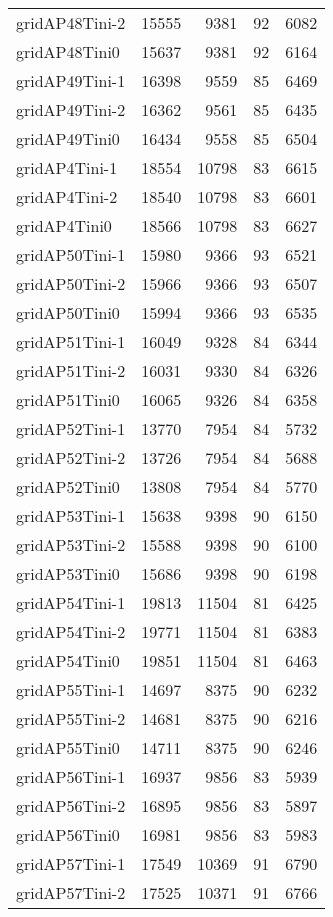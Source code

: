 \begin{longtable}{lrrrr}
gridAP48Tini-2 & 15555 & 9381 & 92 & 6082 \\
gridAP48Tini0 & 15637 & 9381 & 92 & 6164 \\
gridAP49Tini-1 & 16398 & 9559 & 85 & 6469 \\
gridAP49Tini-2 & 16362 & 9561 & 85 & 6435 \\
gridAP49Tini0 & 16434 & 9558 & 85 & 6504 \\
gridAP4Tini-1 & 18554 & 10798 & 83 & 6615 \\
gridAP4Tini-2 & 18540 & 10798 & 83 & 6601 \\
gridAP4Tini0 & 18566 & 10798 & 83 & 6627 \\
gridAP50Tini-1 & 15980 & 9366 & 93 & 6521 \\
gridAP50Tini-2 & 15966 & 9366 & 93 & 6507 \\
gridAP50Tini0 & 15994 & 9366 & 93 & 6535 \\
gridAP51Tini-1 & 16049 & 9328 & 84 & 6344 \\
gridAP51Tini-2 & 16031 & 9330 & 84 & 6326 \\
gridAP51Tini0 & 16065 & 9326 & 84 & 6358 \\
gridAP52Tini-1 & 13770 & 7954 & 84 & 5732 \\
gridAP52Tini-2 & 13726 & 7954 & 84 & 5688 \\
gridAP52Tini0 & 13808 & 7954 & 84 & 5770 \\
gridAP53Tini-1 & 15638 & 9398 & 90 & 6150 \\
gridAP53Tini-2 & 15588 & 9398 & 90 & 6100 \\
gridAP53Tini0 & 15686 & 9398 & 90 & 6198 \\
gridAP54Tini-1 & 19813 & 11504 & 81 & 6425 \\
gridAP54Tini-2 & 19771 & 11504 & 81 & 6383 \\
gridAP54Tini0 & 19851 & 11504 & 81 & 6463 \\
gridAP55Tini-1 & 14697 & 8375 & 90 & 6232 \\
gridAP55Tini-2 & 14681 & 8375 & 90 & 6216 \\
gridAP55Tini0 & 14711 & 8375 & 90 & 6246 \\
gridAP56Tini-1 & 16937 & 9856 & 83 & 5939 \\
gridAP56Tini-2 & 16895 & 9856 & 83 & 5897 \\
gridAP56Tini0 & 16981 & 9856 & 83 & 5983 \\
gridAP57Tini-1 & 17549 & 10369 & 91 & 6790 \\
gridAP57Tini-2 & 17525 & 10371 & 91 & 6766 \\

\end{longtable}
